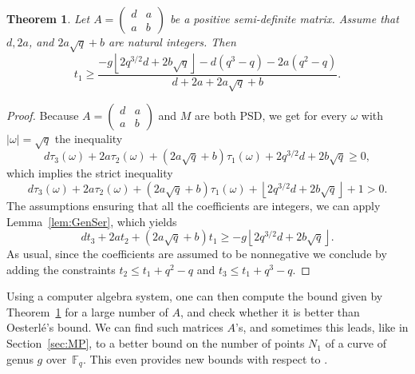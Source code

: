\documentclass{amsart}
\newtheorem{theorem}[defin]{Theorem}
\newcommand{\F}{\mathbb{F}}
\begin{document}
\begin{theorem}\label{thm:boundA3}
Let $A = \begin{pmatrix}
d & a \\ a & b
\end{pmatrix}$ be a positive semi-definite matrix. Assume that $d, 2a$, and $2a\sqrt{q} + b$ are natural integers.
Then 
\[
t_1 \geq \frac{-g \left\lfloor  2q^{3/2}d +2b\sqrt{q} \right\rfloor-d(q^3-q)-2a(q^2-q)}{d+2a + 2a\sqrt{q}+b}. \]
\end{theorem}
\begin{proof}
Because $A = \begin{pmatrix}
d & a \\ a & b
\end{pmatrix}$ and $M$ are both PSD, we get for every $\omega$ with $\left| \omega \right| = \sqrt{q}$ the inequality
\[
 d \tau_3(\omega) + 2a \tau_2(\omega) + (2a\sqrt{q} + b)\tau_1(\omega) +  2q^{3/2}d +2b\sqrt{q} \geq 0,
 \]
which implies the strict inequality
\[
 d \tau_3(\omega) + 2a \tau_2(\omega) + (2a\sqrt{q} + b)\tau_1(\omega) + \left\lfloor  2q^{3/2}d +2b\sqrt{q} \right\rfloor + 1 > 0. \]
The assumptions ensuring that all the coefficients are integers, we can apply Lemma~\ref{lem:GenSer}, which yields
\[
 d t_3 + 2a t_2 + (2a\sqrt{q} + b)t_1  \geq -g \left\lfloor  2q^{3/2}d +2b\sqrt{q} \right\rfloor. \]
As usual, since the coefficients are assumed to be nonnegative we conclude by adding the constraints $t_2 \leq t_1 + q^2 - q$ and $t_3 \leq t_1 + q^3 - q$.
\end{proof}

Using a computer algebra system, one can then compute the bound given by Theorem~\ref{thm:boundA3} for a large number of $A$, and check whether it is better than Oesterl\'e's bound. 
We can find such matrices $A$'s, and sometimes this leads, like in Section~\ref{sec:MP}, to a better bound on the number of points $N_1$ of a curve of genus $g$ over~$\F_q$. 
This even provides new bounds with respect to \cite{MP}.
\end{document}
